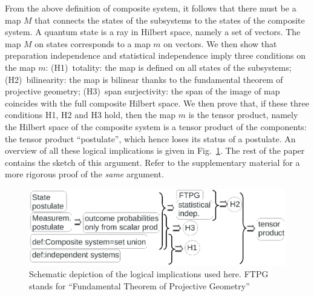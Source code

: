 \documentclass[aps,prl,amsmath,amssymb,twocolumn,nofootinbib]{revtex4}
\theoremstyle{plain}
\theoremstyle{definition}
\theoremstyle{remark}
\def\togli#1{}
\begin{document}
	From the above definition of composite system, it follows that there
	must be a map $M$ that connects the states of the subsystems to the
	states of the composite system. A quantum state is a ray in Hilbert
	space, namely a set of vectors. The map $M$ on states 
	corresponds to a map $m$ on vectors. We then show that preparation
	independence and statistical independence imply three conditions on
	the map $m$: (H1)~totality: the map is defined on all states of the
	subsystems; (H2)~bilinearity: the map is bilinear thanks to the
	fundamental theorem of projective geometry; (H3)~span surjectivity:
	the span of the image of map coincides with the full composite Hilbert space.
	We then prove that, if these three conditions H1, H2 and H3 hold, then
	the map $m$ is the tensor product, namely the Hilbert space of the
	composite system is a tensor product of the components: the tensor
	product ``postulate'', which hence loses its status of a postulate. An
	overview of all these logical implications is given in
	Fig.~\ref{f:fig}. The rest of the paper contains the sketch of this
	argument. Refer to the supplementary material for a more rigorous proof of the \emph{same} argument.
	
	\begin{figure}[h]
		\includegraphics[width=\linewidth, trim={0.2in 5.2in 2.5in 0.6in}, clip=true]{fig.eps}
		\caption{Schematic depiction of the logical implications used here. FTPG stands for ``Fundamental Theorem of Projective Geometry''
			\label{f:fig}}\end{figure}
	\togli{
		\begin{widetext}\begin{verbatim}
			* P1: states and observable postulate.
			* P2: Born rule (measurement postulate). 
			* P1 -> systems can be prepared unconditionally in any state.
			* P2 -> the outcome probabilities depend only on the scalar
			product.
			* 2. Def: Composite system definition: A composite system is a collection of
			(all compatible state give a 
			preparation) and only of (all composite preparations give non-trivial
			measurement on subsystems) the subsystems 
			* P1+ Def -> 1. Preparation independence (all state pairs are compatible)
			* P2+ Def -> 3. Span surjectivity (I.4=H3) (all C is spanned by AxB) 
			* 3 -> 6. Basis carries over I.7
			* 1 + 2 -> 4. Injectivity (M total function) I.5=H1
			* 2 + PI -> 5. Statistical independence I.6 (probability on compatible
			pairs where one subsystem does not change) 
			* 5 -> 7. I.8=H2: scalar product carries over (fundamental theorem of
			projective geometry).
			* 7 + 6 + 4 (i.e. H1+H2+H3) -> 8. m is tensor product   
			\end{verbatim}\end{widetext}
	}
	
\end{document}
